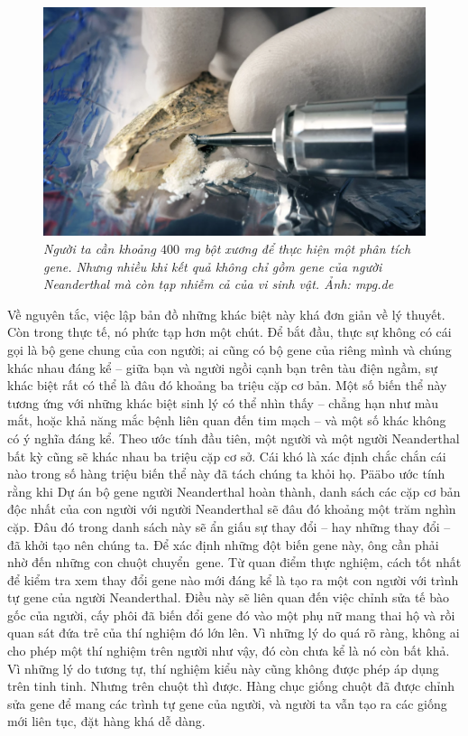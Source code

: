 \begin{multicols}{2}
	\begin{figure}[H]
		\vspace*{-5pt}
		\centering
		\captionsetup{labelformat= empty, justification=centering}
		\includegraphics[width= 1\linewidth]{6}
		\caption{\small\textit{\color{timhieukhoahoc}Người ta cần khoảng $400$ mg bột xương để thực hiện một phân tích gene. Nhưng nhiều khi kết quả không chỉ gồm gene của người Neanderthal mà còn tạp nhiễm cả của vi sinh vật. Ảnh: mpg.de}}
		\vspace*{-10pt}
	\end{figure}
	Về nguyên tắc, việc lập bản đồ những khác biệt này khá đơn giản về lý thuyết. Còn trong thực tế, nó phức tạp hơn một chút. Để bắt đầu, thực sự không có cái gọi là bộ gene chung của con người; ai cũng có bộ gene của riêng mình và chúng khác nhau đáng kể -- giữa bạn và người ngồi cạnh bạn trên tàu điện ngầm, sự khác biệt rất có thể là đâu đó khoảng ba triệu cặp cơ bản. Một số biến thể này tương ứng với những khác biệt sinh lý có thể nhìn thấy -- chẳng hạn như màu mắt, hoặc khả năng mắc bệnh liên quan đến tim mạch -- và một số khác không có ý nghĩa đáng kể. Theo ước tính đầu tiên, một người và một người Neanderthal bất kỳ cũng sẽ khác nhau ba triệu cặp cơ sở. Cái khó là xác định chắc chắn cái nào trong số hàng triệu biến thể này đã tách chúng ta khỏi họ. Pääbo ước tính rằng khi Dự án bộ gene người Neanderthal hoàn thành, danh sách các cặp cơ bản độc nhất của con người với người Neanderthal sẽ đâu đó khoảng một trăm nghìn cặp. Đâu đó trong danh sách này sẽ ẩn giấu sự thay đổi -- hay những thay đổi -- đã khởi tạo nên chúng ta. Để xác định những đột biến gene này, ông cần phải nhờ đến những con chuột chuyển~gene.
	\vskip 0.1cm
	Từ quan điểm thực nghiệm, cách tốt nhất để kiểm tra xem thay đổi gene nào mới đáng kể là tạo ra một con người với trình tự gene của người Neanderthal. Điều này sẽ liên quan đến việc chỉnh sửa tế bào gốc của người, cấy phôi đã biến đổi gene đó vào một phụ nữ mang thai hộ và rồi quan sát đứa trẻ của thí nghiệm đó lớn lên. Vì những lý do quá rõ ràng, không ai cho phép một thí nghiệm trên người như vậy, đó còn chưa kể là nó còn bất khả. Vì những lý do tương tự, thí nghiệm kiểu này cũng không được phép áp dụng trên tinh tinh. Nhưng trên chuột thì được. Hàng chục giống chuột đã được chỉnh sửa gene để mang các trình tự gene của người, và người ta vẫn tạo ra các giống mới liên tục, đặt hàng khá dễ dàng.

\end{multicols}
